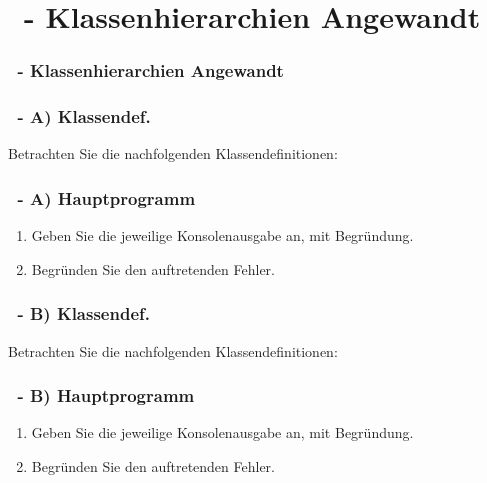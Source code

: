 \def\stitle{\theexercise\ - Klassenhierarchien Angewandt}
\section{\stitle}
\begin{frame}%
  \frametitle{\stitle}%
\tableofcontents[current]
\end{frame}

\begin{frame}%
  \frametitle{\theexercise\ - A) Klassendef.}%

Betrachten Sie die nachfolgenden Klassendefinitionen:

\end{frame}


\begin{frame}[t]%
  \frametitle{\theexercise\ - A) Hauptprogramm}%



\begin{enumerate}
\item Geben Sie die jeweilige Konsolenausgabe an, mit Begründung.
\item Begründen Sie den auftretenden Fehler.
\end{enumerate}
\end{frame}




\begin{frame}%
  \frametitle{\theexercise\ - B) Klassendef.}%

Betrachten Sie die nachfolgenden Klassendefinitionen:

\end{frame}

\begin{frame}[t]%
  \frametitle{\theexercise\ - B) Hauptprogramm}%



\begin{enumerate}
\item Geben Sie die jeweilige Konsolenausgabe an, mit Begründung.
\item Begründen Sie den auftretenden Fehler.
\end{enumerate}
\end{frame}
